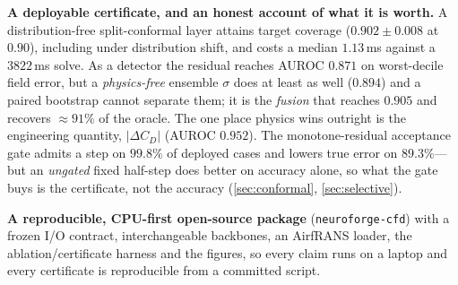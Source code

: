 \item \textbf{A deployable certificate, and an honest account of what it is worth.} A
distribution-free split-conformal layer attains target coverage ($0.902{\pm}0.008$ at
$0.90$), including under distribution shift, and costs a median $1.13$\,ms against a
$3822$\,ms solve. As a detector the residual reaches AUROC $0.871$ on worst-decile field
error, but a \emph{physics-free} ensemble $\sigma$ does at least as well ($0.894$) and a
paired bootstrap cannot separate them; it is the \emph{fusion} that reaches $0.905$ and
recovers ${\approx}91\%$ of the oracle. The one place physics wins outright is the
engineering quantity, $|\Delta C_D|$ (AUROC $0.952$). The monotone-residual acceptance
gate admits a step on $99.8\%$ of deployed cases and lowers true error on $89.3\%$---but
an \emph{ungated} fixed half-step does better on accuracy alone, so what the gate buys is
the certificate, not the accuracy (\autoref{sec:conformal}, \autoref{sec:selective}).

\item \textbf{A reproducible, CPU-first open-source package} (\texttt{neuroforge-cfd})
with a frozen I/O contract, interchangeable backbones, an AirfRANS loader, the
ablation/certificate harness and the figures, so every claim runs on a laptop and every
certificate is reproducible from a committed script.



